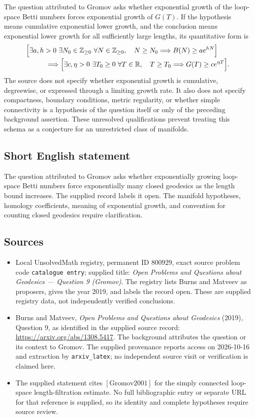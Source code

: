 \documentclass[11pt]{article}
\newcommand{\Z}{\mathbb{Z}}
\newcommand{\R}{\mathbb{R}}
\begin{document}
The question attributed to Gromov asks whether exponential growth of the loop-space Betti numbers forces exponential growth of \(G(T)\). If the hypothesis means cumulative exponential lower growth, and the conclusion means exponential lower growth for all sufficiently large lengths, its quantitative form is
\[
\begin{split}
&\Bigl[\exists a,h>0\ \exists N_0\in\Z_{\geq0}\ \forall N\in\Z_{\geq0},\quad
N\geq N_0\Longrightarrow B(N)\geq a e^{hN}\Bigr]
\\[-2pt]
&\hspace{1cm}\Longrightarrow
\Bigl[\exists c,\eta>0\ \exists T_0\geq0\ \forall T\in\R,\quad
T\geq T_0\Longrightarrow G(T)\geq c e^{\eta T}\Bigr].
\end{split}
\]
The source does not specify whether exponential growth is cumulative, degreewise, or expressed through a limiting growth rate. It also does not specify compactness, boundary conditions, metric regularity, or whether simple connectivity is a hypothesis of the question itself or only of the preceding background assertion. These unresolved qualifications prevent treating this schema as a conjecture for an unrestricted class of manifolds.
\subsection{Short English statement}
The question attributed to Gromov asks whether exponentially growing loop-space Betti numbers force exponentially many closed geodesics as the length bound increases. The supplied record labels it open. The manifold hypotheses, homology coefficients, meaning of exponential growth, and convention for counting closed geodesics require clarification.
\subsection{Sources}
\begin{itemize}
\item Local UnsolvedMath registry, permanent ID \(800929\), exact source problem code \texttt{catalogue entry}; supplied title: \emph{Open Problems and Questions about Geodesics --- Question 9 (Gromov)}. The registry lists Burns and Matveev as proposers, gives the year 2019, and labels the record open. These are supplied registry data, not independently verified conclusions.
\item Burns and Matveev, \emph{Open Problems and Questions about Geodesics} (2019), Question 9, as identified in the supplied source record: \url{https://arxiv.org/abs/1308.5417}. The background attributes the question or its context to Gromov. The supplied provenance reports access on 2026-10-16 and extraction by \texttt{arxiv\_latex}; no independent source visit or verification is claimed here.
\item The supplied statement cites \([\mathrm{Gromov2001}]\) for the simply connected loop-space length-filtration estimate. No full bibliographic entry or separate URL for that reference is supplied, so its identity and complete hypotheses require source review.
\end{itemize}
\end{document}
